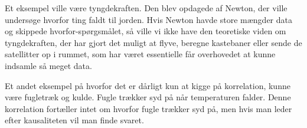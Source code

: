 Et eksempel ville være tyngdekraften. Den blev opdagede af Newton, der ville undersøge hvorfor ting faldt til jorden. Hvis Newton havde store mængder data og skippede hvorfor-spørgsmålet, så ville vi ikke have den teoretiske viden om tyngdekraften, der har gjort det muligt at flyve, beregne kastebaner eller sende de satellitter op i rummet, som har været essentielle får overhovedet at kunne indsamle så meget data. 

Et andet eksempel på hvorfor det er dårligt kun at kigge på korrelation, kunne være fugletræk og kulde. Fugle trækker syd på når temperaturen falder. Denne korrelation fortæller intet om hvorfor fugle trækker syd på, men hvis man leder efter kausaliteten vil man finde svaret.
